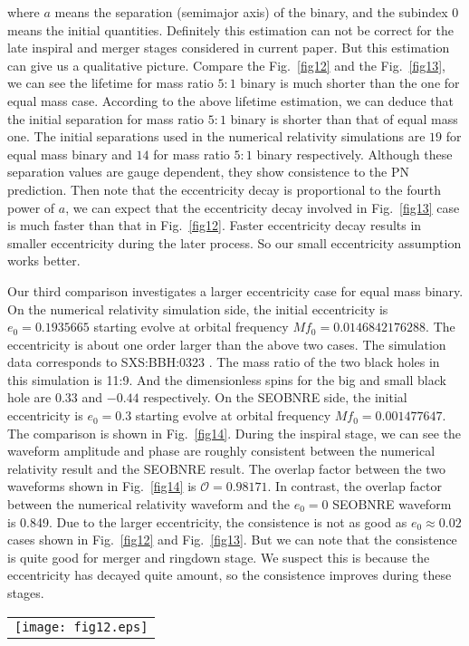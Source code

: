 \documentclass[prd,aps,a4paper,superscriptaddress,twocolumn,footinbib,showpacs]{revtex4}
\begin{document}
where $a$ means the separation (semimajor axis) of the binary, and the subindex $0$ means the initial quantities. Definitely this estimation can not be correct for the late inspiral and merger stages considered in current paper. But this estimation can give us a qualitative picture. Compare the Fig.~\ref{fig12} and the Fig.~\ref{fig13}, we can see the lifetime for mass ratio $5:1$ binary is much shorter than the one for equal mass case. According to the above lifetime estimation, we can deduce that the initial separation for mass ratio $5:1$ binary is shorter than that of equal mass one. The initial separations used in the numerical relativity simulations are $19$ for equal mass binary and $14$ for mass ratio $5:1$ binary respectively. Although these separation values are gauge dependent, they show consistence to the PN prediction. Then note that the eccentricity decay is proportional to the fourth power of $a$, we can expect that the eccentricity decay involved in Fig.~\ref{fig13} case is much faster than that in Fig.~\ref{fig12}. Faster eccentricity decay results in smaller eccentricity during the later process. So our small eccentricity assumption works better.

Our third comparison investigates a larger eccentricity case for equal mass binary. On the numerical relativity simulation side, the initial eccentricity is $e_0=0.1935665$ starting evolve at orbital frequency $Mf_0=0.0146842176288$. The eccentricity is about one order larger than the above two cases. The simulation data corresponds to SXS:BBH:0323 \cite{SXSBBH}. The mass ratio of the two black holes in this simulation is 11:9. And the dimensionless spins for the big and small black hole are $0.33$ and $-0.44$ respectively. On the SEOBNRE side, the initial eccentricity is $e_0=0.3$ starting evolve at orbital frequency $Mf_0=0.001477647$. The comparison is shown in Fig.~\ref{fig14}. During the inspiral stage, we can see the waveform amplitude and phase are roughly consistent between the numerical relativity result and the SEOBNRE result. The overlap factor between the two waveforms shown in Fig.~\ref{fig14} is $\mathcal{O}=0.98171$. In contrast, the overlap factor between the numerical relativity waveform and the $e_0=0$ SEOBNRE waveform is 0.849. Due to the larger eccentricity, the consistence is not as good as $e_0\approx0.02$ cases shown in Fig.~\ref{fig12} and Fig.~\ref{fig13}. But we can note that the consistence is quite good for merger and ringdown stage. We suspect this is because the eccentricity has decayed quite amount, so the consistence improves during these stages.
\begin{figure*}
\begin{tabular}{c}
\texttt{[image: fig12.eps]}
\end{tabular}
\caption{SXS:BBH:0091 one is the SpEC simulation result for equal mass spinless binary black hole with $e_0=0.02181$ at orbital frequency $0.0105565727235$. SEOBNRE one corresponds to $e_0=0.1$ at $Mf_0\approx0.001477647$ for equal mass spinless binary black hole.}\label{fig12}
\end{figure*}
\end{document}
